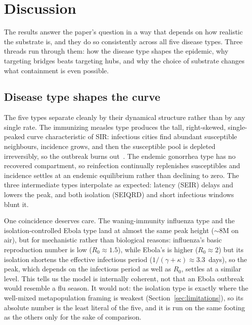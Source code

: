 \section{Discussion}\label{sec:discussion}
The results answer the paper's question in a way that depends on how realistic the substrate is,
and they do so consistently across all five disease types. Three threads run through them: how the
disease type shapes the epidemic, why targeting bridges beats targeting hubs, and why the choice of
substrate changes what containment is even possible.

\subsection{Disease type shapes the curve}
The five types separate cleanly by their dynamical structure rather than by any single rate. The
immunizing measles type produces the tall, right-skewed, single-peaked curve characteristic of
SIR: infectious cities find abundant susceptible neighbours, incidence grows, and then the
susceptible pool is depleted irreversibly, so the outbreak burns out~\cite{kermack:sir}. The
endemic gonorrhea type has no recovered compartment, so reinfection continually replenishes
susceptibles and incidence settles at an endemic equilibrium rather than declining to zero. The
three intermediate types interpolate as expected: latency (SEIR) delays and lowers the peak, and
both isolation (SEIQRD) and short infectious windows blunt it.

One coincidence deserves care. The waning-immunity influenza type and the isolation-controlled
Ebola type land at almost the same peak height ($\sim$$8$M on air), but for mechanistic rather than
biological reasons: influenza's basic reproduction number is low ($R_0\approx1.5$), while Ebola's
is higher ($R_0\approx2$) but its isolation shortens the effective infectious period
($1/(\gamma+\kappa)\approx3.3$~days), so the peak, which depends on the infectious period as well
as $R_0$, settles at a similar level. This tells us the model is internally coherent, not that an
Ebola outbreak would resemble a flu season. It would not: the isolation type is exactly where the
well-mixed metapopulation framing is weakest (Section~\ref{sec:limitations}), so its absolute
number is the least literal of the five, and it is run on the same footing as the others only for
the sake of comparison.

